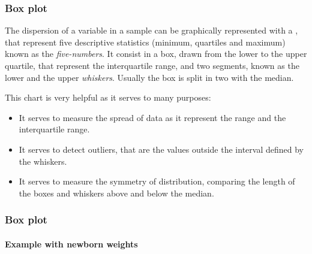 \begin{frame}
\frametitle{Box plot}
The dispersion of a variable in a sample can be graphically represented with a , that
represent five descriptive statistics (minimum, quartiles and maximum) known as the \emph{five-numbers}.
It consist in a box, drawn from the lower to the upper quartile, that represent the interquartile range, and two
segments, known as the lower and the upper \emph{whiskers}.  
Usually the box is split in two with the median. 

This chart is very helpful as it serves to many purposes:  
\begin{itemize}
\item It serves to measure the spread of data as it represent the range and the interquartile range. 
\item It serves to detect outliers, that are the values outside the interval defined by the whiskers.
\item It serves to measure the symmetry of distribution, comparing the length of the boxes and whiskers above and below
the median. 
\end{itemize}
\end{frame}


\begin{frame}
\frametitle{Box plot}
\framesubtitle{Example with newborn weights}
\begin{center}
\scalebox{0.6}{}
\end{center}
\end{frame}


